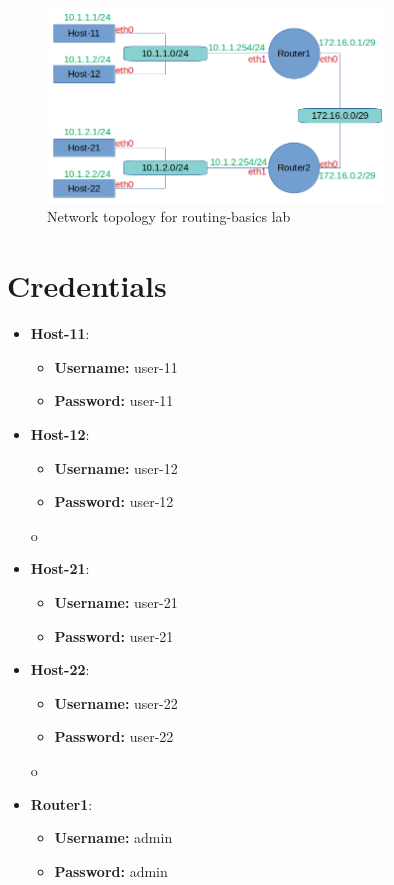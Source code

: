\begin{figure}[H]
\begin{center}
\includegraphics [width=0.8\textwidth]{labtainers-routing-basics-lab-01.png}
\end{center}
\caption{Network topology for routing-basics lab}
\label{fig:topology}
\end{figure}

\section{Credentials}
\begin{itemize}
	\item \textbf{Host-11}:
	\begin{itemize}
		\item \textbf{Username:} user-11
		\item \textbf{Password:} user-11
	\end{itemize}
	\item \textbf{Host-12}:
	\begin{itemize}
		\item \textbf{Username:} user-12
		\item \textbf{Password:} user-12
	\end{itemize}o
	\item \textbf{Host-21}:
	\begin{itemize}
		\item \textbf{Username:} user-21
		\item \textbf{Password:} user-21
	\end{itemize}
	\item \textbf{Host-22}:
	\begin{itemize}
		\item \textbf{Username:} user-22
		\item \textbf{Password:} user-22
	\end{itemize}o
	\item \textbf{Router1}:
	\begin{itemize}
		\item \textbf{Username:} admin
		\item \textbf{Password:} admin
	\end{itemize}
\end{itemize}

